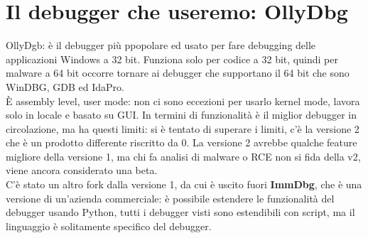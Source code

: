 \documentclass[12pt, oneside]{extbook}
\begin{document}
\section{Il debugger che useremo: OllyDbg}
OllyDgb: è il debugger più ppopolare ed usato per fare debugging delle applicazioni Windows a 32 bit. Funziona solo per codice a 32 bit, quindi per malware a 64 bit occorre tornare ai debugger che supportano il 64 bit che sono WinDBG, GDB ed IdaPro.\\ È assembly level, user mode: non ci sono eccezioni per usarlo kernel mode, lavora solo in locale e basato su GUI. In termini di funzionalità è il miglior debugger in circolazione, ma ha questi limiti: si è tentato di superare i limiti, c'è la versione 2 che è un prodotto differente riscritto da 0. La versione 2 avrebbe qualche feature migliore della versione 1, ma chi fa analisi di malware o RCE non si fida della v2, viene ancora considerato una beta.\\ C'è stato un altro fork dalla versione 1, da cui è uscito fuori \textbf{ImmDbg}, che è una versione di un'azienda commerciale: è possibile estendere le funzionalità del debugger usando Python, tutti i debugger visti sono estendibili con script, ma il linguaggio è solitamente specifico del debugger.
\end{document}
